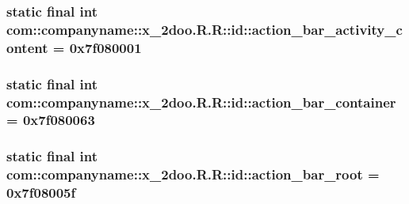 \hypertarget{classcom_1_1companyname_1_1x__2doo_1_1_r_1_1id_a21ca803d2ee398af617cbe51e1a6c64}{
\subsubsection[{action\_\-bar\_\-activity\_\-content}]{\setlength{\rightskip}{0pt plus 5cm}static final int com::companyname::x\_\-2doo.R.R::id::action\_\-bar\_\-activity\_\-content = 0x7f080001}}
\label{classcom_1_1companyname_1_1x__2doo_1_1_r_1_1id_a21ca803d2ee398af617cbe51e1a6c64}


\hypertarget{classcom_1_1companyname_1_1x__2doo_1_1_r_1_1id_c3e47ff991a319278382a6f684619514}{
\subsubsection[{action\_\-bar\_\-container}]{\setlength{\rightskip}{0pt plus 5cm}static final int com::companyname::x\_\-2doo.R.R::id::action\_\-bar\_\-container = 0x7f080063}}
\label{classcom_1_1companyname_1_1x__2doo_1_1_r_1_1id_c3e47ff991a319278382a6f684619514}


\hypertarget{classcom_1_1companyname_1_1x__2doo_1_1_r_1_1id_74291bbc5d9809282250ee8f4d632a7c}{
\subsubsection[{action\_\-bar\_\-root}]{\setlength{\rightskip}{0pt plus 5cm}static final int com::companyname::x\_\-2doo.R.R::id::action\_\-bar\_\-root = 0x7f08005f}}
\label{classcom_1_1companyname_1_1x__2doo_1_1_r_1_1id_74291bbc5d9809282250ee8f4d632a7c}


